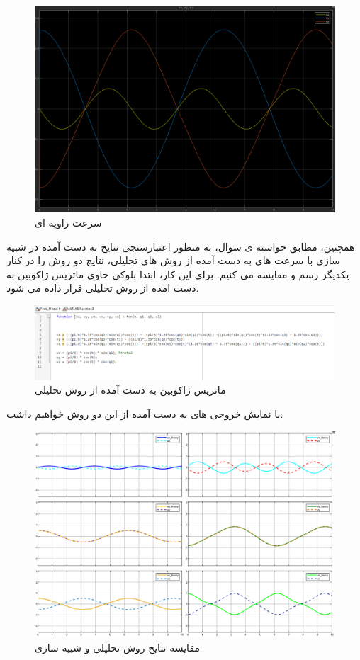 \begin{figure}[htbp]
	\centering
	\includegraphics[width=0.7\linewidth]{../img/w_out_plot}
	\caption{سرعت زاویه ای}
	\label{fig:woutplot}
\end{figure}
\FloatBarrier
همچنین، مطابق خواسته ی سوال، به منظور اعتبارسنجی نتایح به دست آمده در شبیه سازی با سرعت های به دست آمده از روش های تحلیلی، نتایج دو روش را در کنار یکدیگر رسم و مقایسه می کنیم.
برای این کار، ابتدا بلوکی حاوی ماتریس ژاکوبین به دست امده از روش تحلیلی قرار داده می شود.
\begin{figure}[htbp]
	\centering
	\includegraphics[width=1\linewidth]{"../img/compare matlab function"}
	\caption{ماتریس ژاکوبین به دست آمده از روش تحلیلی}
	\label{fig:compare-matlab-function}
\end{figure}
\FloatBarrier
با نمایش خروجی های به دست آمده از این دو روش خواهیم داشت:
\begin{figure}[htbp]
	\centering
	\includegraphics[width=0.7\linewidth]{"../img/compare plot"}
	\caption{مقایسه نتایج روش تحلیلی و شبیه سازی}
	\label{fig:compare-plot}
\end{figure}
